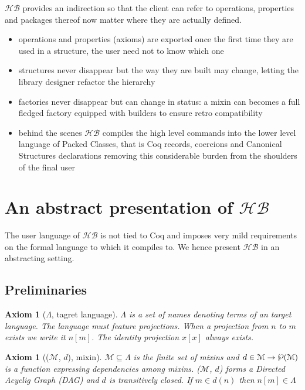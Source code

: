 \documentclass[a4paper,UKenglish,cleveref, autoref]{lipics-v2019}
\newcommand{\HB}{\ensuremath{\mathcal{HB}}}
\newcommand{\Lang}{\ensuremath{\Lambda}}
\newcommand{\mixin}{mixin}
\newcommand{\mixins}{mixins}
\newcommand{\M}{\ensuremath{\mathcal{M}}}
\newcommand{\factory}{factory}
\newcommand{\factories}{factories}
\newcommand{\builder}{builder}
\newcommand{\depx}{\ensuremath{d}}
\newcommand{\powerset}[1]{\raisebox{.15\baselineskip}{\Large\ensuremath{\wp}}(#1)}
\newcommand{\proj}[2]{\ensuremath{#1[#2]}}
\theoremstyle{implem}
\theoremstyle{implem}
\newcounter{axiomcounter}
\theoremstyle{axiom}
\newtheorem{axiom}[axiomcounter]{Axiom}
\theoremstyle{abscommand}
\theoremstyle{command}
\newcommand{\boldclaim}[1]{#1}
\begin{document}
\HB{} provides an indirection so that the client can refer to operations,
properties and packages thereof now matter where they are actually defined.

\begin{itemize}
\item operations and properties (axioms) are exported once the first time they
      are used in a structure, the user need not to know which one
\item structures never disappear but the way they are built may change, letting
      the library designer refactor the hierarchy
\item \factories{} never disappear but can change in status: a \mixin{} can
      becomes a full fledged \factory{} equipped with \builder{}s to ensure
      retro compatibility
\item behind the scenes \HB{} compiles the high level commands into
      the lower level language of Packed Classes, that is Coq records, coercions
      and Canonical Structures declarations removing this considerable burden
      from the shoulders of the final user
\end{itemize}

\section{An abstract presentation of \HB{}}

\boldclaim{The user language of \HB{} is not tied to Coq and imposes very mild requirements
on the formal language to which it compiles to. We hence present \HB{} in an
abstracting setting.}

\subsection{Preliminaries}

\begin{axiom}[\Lang{}, tagret language]\label{def:universe}
  \Lang{} is a set of names denoting terms of an target language.
  The language must feature projections. When
  a projection from $n$ to $m$ exists we write it \proj{n}{m}.
  The identity projection \proj{x}{x} always exists.
\end{axiom}

\begin{axiom}[(\M{}, \depx{}), \mixin{}]\label{def:mixin}
\( \M{} \subseteq \Lang{} \) is the finite set of \mixins{} and
\( \depx \in \M{} \to \powerset\M{} \) is a function expressing
dependencies among \mixins{}.
(\M{}, \depx{}) forms a Directed Acyclig Graph (DAG) and
\depx{} is transitively closed.
If \(m \in \depx{}(n) \) then \( \proj{n}{m} \in \Lang{} \)
\end{axiom}
\end{document}
